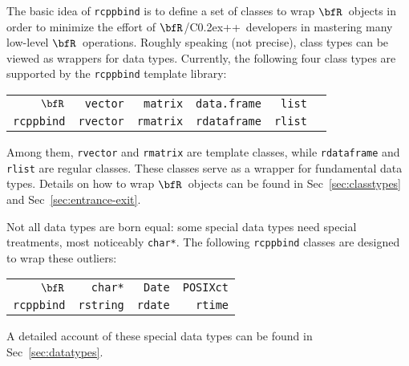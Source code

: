 \documentclass{article}
\def\C++{C{\raise 0.2ex\hbox{++}}}
\newcommand{\R}{$\bfR$}
\begin{document}
The basic idea of \texttt{rcppbind} is to define a set of
classes to wrap \R\ objects in order to minimize the
effort of \R/\C++\ developers in mastering many low-level \R\
operations.  Roughly speaking (not precise), class types can
be viewed as wrappers for data types.  Currently, the
following four class types are supported by the
\texttt{rcppbind} template library:
\begin{center}
  \begin{tabular}{r|rrrrr} \hline\hline
    \R                & \texttt{vector} & \texttt{matrix} & \texttt{data.frame} & \texttt{list} \\
    \texttt{rcppbind} & \texttt{rvector} & \texttt{rmatrix} & \texttt{rdataframe} & \texttt{rlist} \\
    \hline\hline
  \end{tabular}
\end{center}
Among them, \texttt{rvector} and \texttt{rmatrix} are
template classes, while \texttt{rdataframe} and
\texttt{rlist} are regular classes. These classes serve as a
wrapper for fundamental data types. Details on how to wrap
\R\ objects can be found in Sec~\ref{sec:classtypes} and
Sec~\ref{sec:entrance-exit}.

Not all data types are born equal: some special data types
need special treatments, most noticeably \texttt{char*}. The
following \texttt{rcppbind} classes are designed to wrap
these outliers: 
\begin{center}
  \begin{tabular}{r|rrr} \hline\hline
    \R                & \texttt{char*} & \texttt{Date} & \texttt{POSIXct} \\
    \texttt{rcppbind} & \texttt{rstring} & \texttt{rdate} & \texttt{rtime} \\
    \hline\hline
  \end{tabular}
\end{center}
A detailed account of these special data types can be found
in Sec~\ref{sec:datatypes}.
\end{document}
